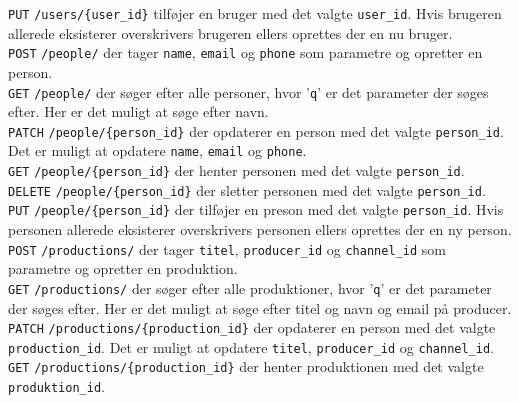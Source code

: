 \noindent
\texttt{PUT} \texttt{/users/\{user\_id\}} tilføjer en bruger med det valgte \texttt{user\_id}. Hvis brugeren allerede eksisterer overskrivers brugeren ellers oprettes der en nu bruger.\\

\texttt{POST} \texttt{/people/} der tager \texttt{name}, \texttt{email} og \texttt{phone} som parametre og opretter en person.\\

\noindent
\texttt{GET} \texttt{/people/} der søger efter alle personer, hvor '\texttt{q}' er det parameter der søges efter. Her er det muligt at søge efter navn.\\

\noindent
\texttt{PATCH} \texttt{/people/\{person\_id\}} der opdaterer en person med det valgte \texttt{person\_id}. Det er muligt at opdatere \texttt{name}, \texttt{email} og \texttt{phone}.\\

\noindent
\texttt{GET} \texttt{/people/\{person\_id\}} der henter personen med det valgte \texttt{person\_id}.\\

\noindent
\texttt{DELETE} \texttt{/people/\{person\_id\}} der sletter personen med det valgte \texttt{person\_id}.\\

\noindent
\texttt{PUT} \texttt{/people/\{person\_id\}} der tilføjer en preson med det valgte \texttt{person\_id}. Hvis personen allerede eksisterer overskrivers personen ellers oprettes der en ny person.\\

\texttt{POST} \texttt{/productions/} der tager \texttt{titel}, \texttt{producer\_id} og \texttt{channel\_id} som parametre og opretter en produktion.\\

\noindent
\texttt{GET} \texttt{/productions/} der søger efter alle produktioner, hvor '\texttt{q}' er det parameter der søges efter. Her er det muligt at søge efter titel og navn og email på producer.\\

\noindent
\texttt{PATCH} \texttt{/productions/\{production\_id\}} der opdaterer en person med det valgte \texttt{production\_id}. Det er muligt at opdatere \texttt{titel}, \texttt{producer\_id} og \texttt{channel\_id}.\\

\noindent
\texttt{GET} \texttt{/productions/\{production\_id\}} der henter produktionen med det valgte \texttt{produktion\_id}.\\

